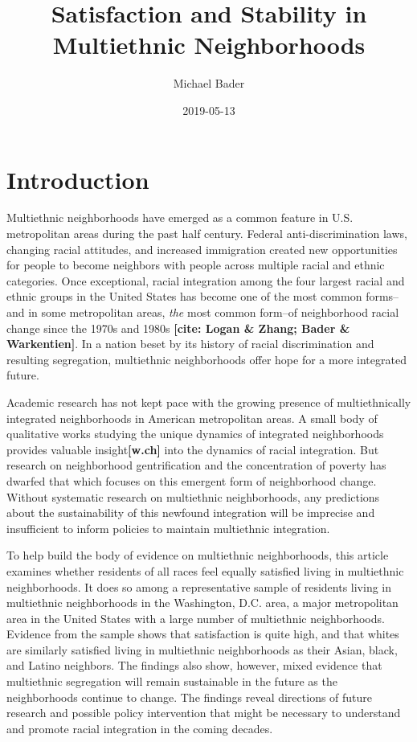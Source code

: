 \documentclass[]{article}
\title{Satisfaction and Stability in Multiethnic Neighborhoods}
\author{Michael Bader}
\date{2019-05-13}
\theoremstyle{definition}
\theoremstyle{definition}
\theoremstyle{definition}
\theoremstyle{remark}
\begin{document}
\maketitle

\doublespacing
\section{Introduction}\label{introduction}

Multiethnic neighborhoods have emerged as a common feature in U.S.
metropolitan areas during the past half century. Federal
anti-discrimination laws, changing racial attitudes, and increased
immigration created new opportunities for people to become neighbors
with people across multiple racial and ethnic categories. Once
exceptional, racial integration among the four largest racial and ethnic
groups in the United States has become one of the most common forms--and
in some metropolitan areas, \emph{the} most common form--of neighborhood
racial change since the 1970s and 1980s \textbf{{[}cite: Logan \& Zhang;
Bader \& Warkentien{]}}. In a nation beset by its history of racial
discrimination and resulting segregation, multiethnic neighborhoods
offer hope for a more integrated future.

Academic research has not kept pace with the growing presence of
multiethnically integrated neighborhoods in American metropolitan areas.
A small body of qualitative works studying the unique dynamics of
integrated neighborhoods provides valuable insight\textbf{{[}w.ch{]}}
into the dynamics of racial integration. But research on neighborhood
gentrification and the concentration of poverty has dwarfed that which
focuses on this emergent form of neighborhood change. Without systematic
research on multiethnic neighborhoods, any predictions about the
sustainability of this newfound integration will be imprecise and
insufficient to inform policies to maintain multiethnic integration.

To help build the body of evidence on multiethnic neighborhoods, this
article examines whether residents of all races feel equally satisfied
living in multiethnic neighborhoods. It does so among a representative
sample of residents living in multiethnic neighborhoods in the
Washington, D.C. area, a major metropolitan area in the United States
with a large number of multiethnic neighborhoods. Evidence from the
sample shows that satisfaction is quite high, and that whites are
similarly satisfied living in multiethnic neighborhoods as their Asian,
black, and Latino neighbors. The findings also show, however, mixed
evidence that multiethnic segregation will remain sustainable in the
future as the neighborhoods continue to change. The findings reveal
directions of future research and possible policy intervention that
might be necessary to understand and promote racial integration in the
coming decades.
\end{document}
